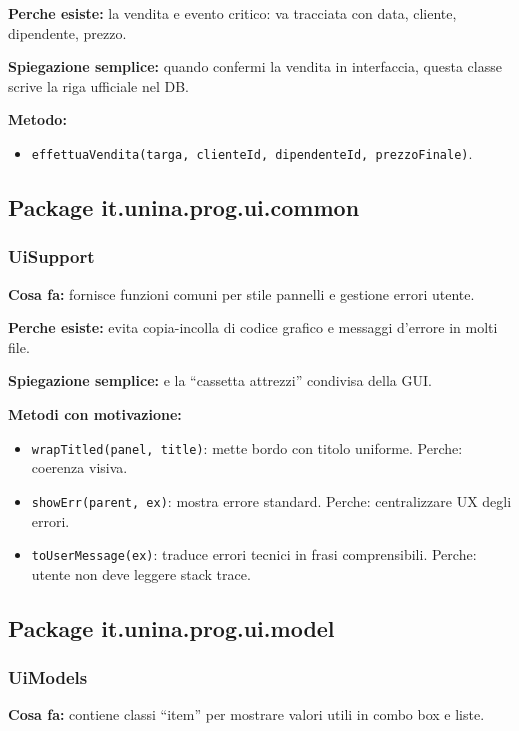 \documentclass[12pt,a4paper]{article}
\begin{document}
\textbf{Perche esiste:}
la vendita e evento critico: va tracciata con data, cliente, dipendente, prezzo.

\textbf{Spiegazione semplice:}
quando confermi la vendita in interfaccia, questa classe scrive la riga ufficiale nel DB.

\textbf{Metodo:}
\begin{itemize}
  \item \texttt{effettuaVendita(targa, clienteId, dipendenteId, prezzoFinale)}.
\end{itemize}

\subsection{Package it.unina.prog.ui.common}

\subsubsection*{UiSupport}
\textbf{Cosa fa:}
fornisce funzioni comuni per stile pannelli e gestione errori utente.

\textbf{Perche esiste:}
evita copia-incolla di codice grafico e messaggi d'errore in molti file.

\textbf{Spiegazione semplice:}
e la ``cassetta attrezzi'' condivisa della GUI.

\textbf{Metodi con motivazione:}
\begin{itemize}
  \item \texttt{wrapTitled(panel, title)}: mette bordo con titolo uniforme. Perche: coerenza visiva.
  \item \texttt{showErr(parent, ex)}: mostra errore standard. Perche: centralizzare UX degli errori.
  \item \texttt{toUserMessage(ex)}: traduce errori tecnici in frasi comprensibili. Perche: utente non deve leggere stack trace.
\end{itemize}

\subsection{Package it.unina.prog.ui.model}

\subsubsection*{UiModels}
\textbf{Cosa fa:}
contiene classi ``item'' per mostrare valori utili in combo box e liste.
\end{document}
